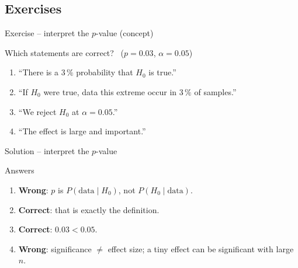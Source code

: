 \documentclass[aspectratio=169,11pt]{beamer}
\begin{document}
\subsection{Exercises}

\begin{frame}{Exercise -- interpret the $p$-value (concept)}
  \begin{block}{Which statements are correct? \ ($p = 0.03$, $\alpha=0.05$)}
    \begin{enumerate}
      \item ``There is a $3\,\%$ probability that $H_0$ is true.''
      \item ``If $H_0$ were true, data this extreme occur in $3\,\%$ of samples.''
      \item ``We reject $H_0$ at $\alpha=0.05$.''
      \item ``The effect is large and important.''
    \end{enumerate}
  \end{block}
\end{frame}

\begin{frame}{Solution -- interpret the $p$-value}
  \begin{exampleblock}{Answers}
    \begin{enumerate}
      \item \textbf{Wrong}: $p$ is $P(\text{data}\mid H_0)$, not
            $P(H_0\mid \text{data})$.
      \item \textbf{Correct}: that is exactly the definition.
      \item \textbf{Correct}: $0.03 < 0.05$.
      \item \textbf{Wrong}: significance $\neq$ effect size; a tiny effect can
            be significant with large $n$.
    \end{enumerate}
  \end{exampleblock}
\end{frame}
\end{document}
